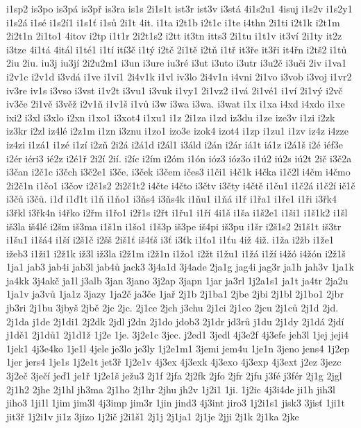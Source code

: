 i1sp2
is3po
is3pá
is3př
is3ra
is1s
2i1s1t
ist3r
ist3v
i3stá
4i1s2u1
4isuj
i1s2v
i1s2y1
i1s2á
i1sé
i1s2í1
i1s1ť
i1sů
2i1t
4it.
i1ta
i2t1b
i2t1c
i1te
i4thn
2i1ti
i2t1k
i2t1m
2i2t1n
2i1to1
4itov
i2tp
i1t1r
2i2t1s2
i2tt
it3tn
itts3
2i1tu
i1t1v
it3ví
2i1ty
it2z
i3tze
4i1tá
4itál
i1té1
i1tí
ití3č
i1tý
i2tč
2i1tě
i2tň
i1tř
it3ře
it3ři
it4řn
i2tš2
i1tů
2iu
2iu.
iu3j
iu3jí
2i2u2m1
i3un
i3ure
iu3ré
i3ut
i3uto
i3utr
i3u2č
i3uči
2iv
i1va1
i2v1c
i2v1d
i3vdá
i1ve
i1vi1
2i4v1k
i1vl
iv3lo
2i4v1n
i4vni
2i1vo
i3vob
i3voj
i1vr2
iv3re
iv1s
i3vso
i3vst
i1v2t
i3vu1
i3vuk
i1vy1
2i1vz2
i1vá
2i1vé1
i1ví
2i1vý
i2vč
iv3če
2i1vě
i3věž
i2v1ň
i1v1š
i1vů
i3w
i3wa
i3wa.
i3wat
i1x
i1xa
i4xd
i4xdo
i1xe
ixi2
i3xl
i3xlo
i2xn
i1xo1
i3xot4
i1xu1
i1z
2i1za
i1zd
iz3du
i1ze
ize3v
i1zi
i2zk
iz3kr
i2zl
iz4lé
i2z1m
i1zn
i3znu
i1zo1
izo3e
izok4
izot4
i1zp
i1zu1
i1zv
iz4z
i4zze
iz4zi
i1zá1
i1zé
i1zí
i2zň
2i2á
i2á1d
i2ál1
i3áld
i2án
i2ár
iá1t
iá1z
i2á1š
i2é
iéf3e
i2ér
iéri3
ié2z
i2é1ř
2i2í
2ií.
i2íc
i2ím
i2óm
i1ón
ióz3
ióz3o
i1ú2
iú2s
iú2t
2ič
i3č2a
i3čan
i2č1c
i3čch
i3č2e1
i3če.
i3ček
i3čem
ičes3
i1či1
i4č1k
i4čka
i1č2l
i4čm
i4čmo
2i2č1n
i1čo1
i3čov
i2č1s2
2i2č1t2
i4čte
i4čto
i3čtv
i3čty
i4čtě
i1ču1
i1č2á
i1č2í
ič1č
i3čů
i3čů.
i1ď
i1ď1t
i1ň
i1ňo1
i3ňs4
i3ňs4k
i1ňu1
i1ňá
i1ř
i1řa1
i1ře1
i1ři
i3řk4
i3řkl
i3řk4n
i4řko
i2řm
i1řo1
i2ř1s
i2řt
i1řu1
i1ří
4i1š
i1ša
i1š2e1
i1ši1
i1š1k2
i1šl
iš3la
iš4lé
i2šm
iš3ma
i1š1n
i1šo1
i1š3p
iš3pe
iš4pi
iš3pu
i1šr
i2š1s2
2i1š1t
iš3tr
i1šu1
i1šá4
i1ší
i2š1č
i2šš
2iš1ť
iš4ťš
i3ť
i3ťk
i1ťo1
i1ťu
4iž
4iž.
i1ža
i2žb
i1že1
ižeb3
i1ži1
i2ž1k
iž3l
iž3la
i2ž1m
i2ž1n
i1žo1
i2žt
i1žu1
i1žá
i1ží
i4žó
i4žón
i2ž1š
1ja1
jab3
jab4i
jab3l
jab4ů
jack3
3j4a1d
3j4ade
2ja1g
jag4i
jag3r
ja1h
jah3v
1ja1k
ja4kk
3j4akč
ja1l
j3alb
3jan
3jano
3j2ap
3japn
1jar
ja3rl
1j2a1s1
ja1t
ja4tr
2ja2u
1ja1v
ja3vů
1ja1z
3jazy
1ja2č
ja3če
1jař
2j1b
2j1ba1
2jbe
2jbi
2j1bl
2j1bo1
2jbr
jb3ri
2j1bu
3jbyš
2jbě
2jc
2jc.
2j1ce
2jch
j3chu
2j1ci
2j1co
2jcu
2j1ců
2j1d
2jd.
2j1da
j1de
2j1di1
2j2dk
2jdl
j2dn
2j1do
jdob3
2j1dr
jd3rů
j1du
2j1dy
2j1dá
2jdí
j1dě1
2j1dů1
2j1d1ž
1j2e
1je.
3j2e1c
3jec.
j2ed1
3jedl
4j3e2f
4j3efe
jeh3l
1jej
jeji4
1jek1
4j3e4ko
1je1l
4jele
je3lo
je3ly
1j2e1m1
3jemi
jem4u
1je1n
3jeno
jens4
1j2ep
1jer
jers4
1je1s
1j2e1t
jet3ř
1j2e1v
4j3ex
4j3exk
4j3exo
4j3exp
4j3ext
j2ez
3jezc
3j2eč
3ječí
jeď1
je1ř
1j2e1š
ježu3
2j1f
2jfa
2j2fk
2jfo
2jfr
2jfu
j3fé
j3fér
2j1g
2jgl
2j1h2
2jhe
2j1hl
jh3ma
2j1ho
2j1hr
2jhu
jh2v
1j2i1
1ji.
1j2ic
4j3i4de
ji1h
jih3l
jiho3
1ji1l
1jim
jim3l
4j3imp
jim3r
1jin
jind3
4j3int
jiro3
1j2i1s1
jisk3
3jisť
1ji1t
jit3ř
1j2i1v
ji1z
3jizo
1j2ič
j2i1š1
2j1j
2j1ja1
2j1je
2jji
2j1k
2j1ka
2jke
